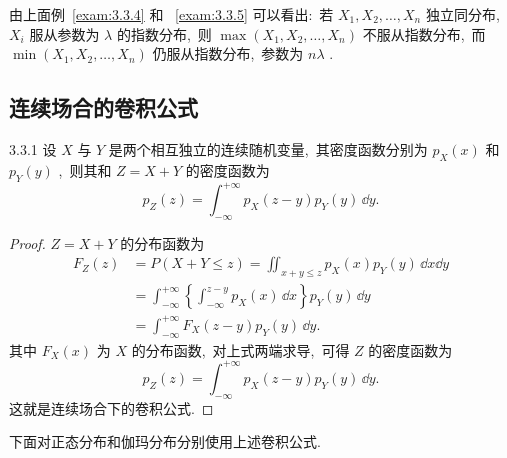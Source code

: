    由上面例~\ref{exam:3.3.4} 和 ~\ref{exam:3.3.5} 可以看出:\ 若 $X_1,X_2,\ldots,X_n$ 独立同分布,\ $X_i$ 服从参数为 $\lambda$ 的指数分布,\ 则 $\max(X_1,X_2,\ldots,X_n)$ 不服从指数分布,\ 而 $\min(X_1,X_2,\ldots,X_n)$ 仍服从指数分布,\ 参数为 $n\lambda$ .
   \subsection{连续场合的卷积公式}\label{ssec:3.3.3}
   \begin{theorem}{}{3.3.1}
   	设 $X$ 与 $Y$ 是两个相互独立的连续随机变量,\ 其密度函数分别为 $p_X(x)$ 和 $p_Y(y)$ ,\ 则其和 $Z=X+Y$ 的密度函数为
   	\begin{equation}
   		p_Z(z)=\int_{-\infty}^{+\infty}p_X(z-y)p_Y(y)\,\dd y.\label{eq:3.3.13}
   	\end{equation}
   	\begin{proof}
   		$Z=X+Y$ 的分布函数为
   		\begin{align*}
   			F_Z(z)&=P(X+Y\leqslant z)=\iint_{x+y\leqslant z}p_X(x)p_Y(y)\,\dd x\dd y\\
   			&=\int_{-\infty}^{+\infty}\left\{\int_{-\infty}^{z-y}p_X(x)\,\dd x\right\}p_Y(y)\,\dd y\\
   			&=\int_{-\infty}^{+\infty}F_X(z-y)p_Y(y)\,\dd y.
   		\end{align*}
   		其中 $F_X(x)$ 为 $X$ 的分布函数,\ 对上式两端求导,\ 可得 $Z$ 的密度函数为
   		\begin{equation*}
   			p_Z(z)=\int_{-\infty}^{+\infty}p_X(z-y)p_Y(y)\,\dd y.
   		\end{equation*}
   		这就是连续场合下的卷积公式.
   	\end{proof}
   \end{theorem}
   下面对正态分布和伽玛分布分别使用上述卷积公式.
